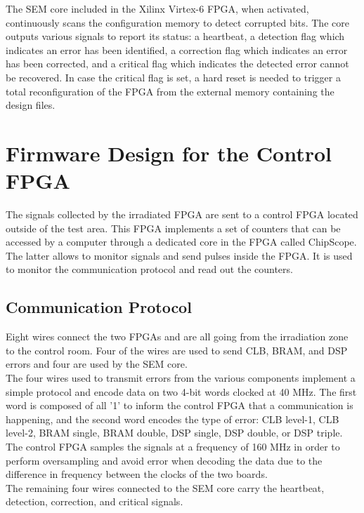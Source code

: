       The SEM core included in the Xilinx Virtex-6 FPGA, when activated, continuously scans the configuration memory to detect corrupted bits. The core outputs various signals to report its status: a heartbeat, a detection flag which indicates an error has been identified, a correction flag which indicates an error has been corrected, and a critical flag which indicates the detected error cannot be recovered. In case the critical flag is set, a hard reset is needed to trigger a total reconfiguration of the FPGA from the external memory containing the design files.

  \section{Firmware Design for the Control FPGA}

    The signals collected by the irradiated FPGA are sent to a control FPGA located outside of the test area. This FPGA implements a set of counters that can be accessed by a computer through a dedicated core in the FPGA called ChipScope. The latter allows to monitor signals and send pulses inside the FPGA. It is used to monitor the communication protocol and read out the counters.

    \subsection{Communication Protocol}

      Eight wires connect the two FPGAs and are all going from the irradiation zone to the control room. Four of the wires are used to send CLB, BRAM, and DSP errors and four are used by the SEM core. \\

      The four wires used to transmit errors from the various components implement a simple protocol and encode data on two 4-bit words clocked at 40 MHz. The first word is composed of all '1' to inform the control FPGA that a communication is happening, and the second word encodes the type of error: CLB level-1, CLB level-2, BRAM single, BRAM double, DSP single, DSP double, or DSP triple. The control FPGA samples the signals at a frequency of 160 MHz in order to perform oversampling and avoid error when decoding the data due to the difference in frequency between the clocks of the two boards. \\

      The remaining four wires connected to the SEM core carry the heartbeat, detection, correction, and critical signals.

